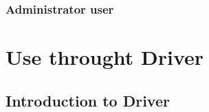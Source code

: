 \documentclass{scalatekids-article}
\begin{document}






\subsubsection{Administrator user}
\label{sec:administratoruser}

\section{Use throught Driver}

\subsection{Introduction to Driver}

\listoftables

\listoffigures
\end{document}
